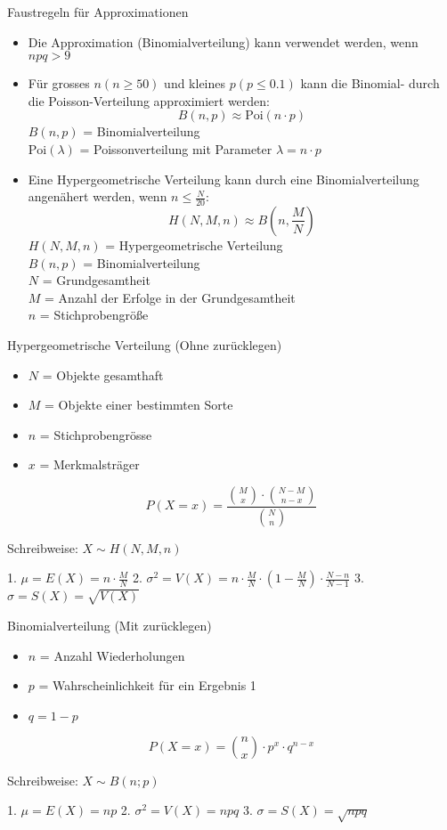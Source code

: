 \begin{concept}{Faustregeln für Approximationen}
\begin{itemize}
  \item Die Approximation (Binomialverteilung) kann verwendet werden, wenn $npq > 9$
  \item Für grosses $n(n \geq 50)$ und kleines $p(p \leq 0.1)$ kann die Binomial- durch die Poisson-Verteilung approximiert werden:
  $$
  B(n,p) \approx \text{Poi}(n \cdot p)
  $$
  $B(n,p)$ = Binomialverteilung\\
  $\text{Poi}(\lambda)$ = Poissonverteilung mit Parameter $\lambda = n \cdot p$\\
  
  \item Eine Hypergeometrische Verteilung kann durch eine Binomialverteilung angenähert werden, wenn $n \leq \frac{N}{20}$:
  $$
  H(N,M,n) \approx B(n,\frac{M}{N})
  $$
  $H(N,M,n)$ = Hypergeometrische Verteilung\\
  $B(n,p)$ = Binomialverteilung\\
  $N$ = Grundgesamtheit\\
  $M$ = Anzahl der Erfolge in der Grundgesamtheit\\
  $n$ = Stichprobengröße\\
\end{itemize}
\end{concept}
\begin{definition}{Hypergeometrische Verteilung (Ohne zurücklegen)}
\begin{itemize}
  \item $N$ = Objekte gesamthaft
  \item $M$ = Objekte einer bestimmten Sorte
  \item $n$ = Stichprobengrösse
  \item $x$ = Merkmalsträger
\end{itemize}

$$P(X=x)=\frac{\binom{M}{x} \cdot \binom{N-M}{n-x}}{\binom{N}{n}}$$

Schreibweise: $X \sim H(N,M,n)$

1. $\mu = E(X) = n \cdot \frac{M}{N}$
2. $\sigma^2 = V(X) = n \cdot \frac{M}{N} \cdot (1-\frac{M}{N}) \cdot \frac{N-n}{N-1}$
3. $\sigma = S(X) = \sqrt{V(X)}$
\end{definition}

\begin{definition}{Binomialverteilung (Mit zurücklegen)}
\begin{itemize}
  \item $n$ = Anzahl Wiederholungen
  \item $p$ = Wahrscheinlichkeit für ein Ergebnis 1
  \item $q = 1-p$
\end{itemize}

$$P(X=x) = \binom{n}{x} \cdot p^x \cdot q^{n-x}$$

Schreibweise: $X \sim B(n;p)$

1. $\mu = E(X) = np$
2. $\sigma^2 = V(X) = npq$
3. $\sigma = S(X) = \sqrt{npq}$
\end{definition}

